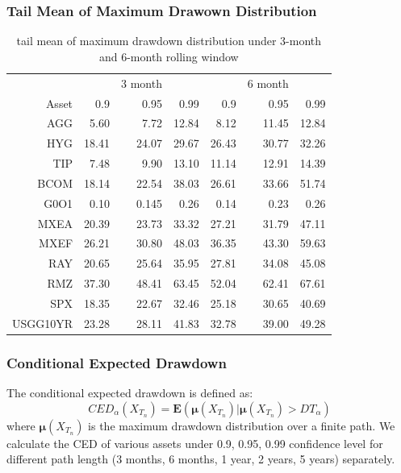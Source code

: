 \documentclass{beamer}
\newcommand\Fontviii{\fontsize{8}{9.2}\selectfont}
\begin{document}
\begin{frame}
\frametitle{Tail Mean of Maximum Drawown Distribution}
\Fontviii
\begin{table}[!h]
\centering 
\caption{tail mean of maximum drawdown distribution under 3-month and 6-month rolling window} %
\begin{tabular}{ | r || r r r || r r r |} 
 \hline
 & & 3 month & & & 6 month & \\
Asset& 0.9 & 0.95 & 0.99 & 0.9 & 0.95 & 0.99  \\
  \hline \hline
AGG &  5.60 &  7.72 & 12.84 &  8.12 & 11.45 & 12.84\\ 
HYG & 18.41 & 24.07 & 29.67 & 26.43 & 30.77 & 32.26\\ 
TIP &  7.48 &  9.90 & 13.10 & 11.14 & 12.91 & 14.39\\ 
BCOM & 18.14 & 22.54 & 38.03 & 26.61 & 33.66 & 51.74\\ 
G0O1 &  0.10 &  0.145 &  0.26 &  0.14 &  0.23 &  0.26\\ 
MXEA & 20.39 & 23.73 & 33.32 & 27.21 & 31.79 & 47.11\\ 
MXEF & 26.21 & 30.80 & 48.03 & 36.35 & 43.30 & 59.63\\ 
RAY & 20.65 & 25.64 & 35.95 & 27.81 & 34.08 & 45.08\\ 
RMZ & 37.30 & 48.41 & 63.45 & 52.04 & 62.41 & 67.61\\ 
SPX & 18.35 & 22.67 & 32.46 & 25.18 & 30.65 & 40.69\\ 
USGG10YR & 23.28 & 28.11 & 41.83 & 32.78 & 39.00 & 49.28\\
 \hline
\end{tabular}
\label{table:CED3}
\end{table}
\end{frame}


\begin{frame}
\frametitle{Conditional Expected Drawdown}
The conditional expected drawdown is defined as:
\begin{equation}
CED_\alpha(X_{T_n}) = \textbf{E}(\mathbf{\mu}(X_{T_n})|\mathbf{\mu}(X_{T_n}) > DT_\alpha)
\end{equation}
where $\mathbf{\mu}(X_{T_n})$ is the maximum drawdown distribution over a finite path.
We calculate the CED of various assets under 0.9, 0.95, 0.99 confidence level for different path length (3 months, 6 months, 1 year, 2 years, 5 years) separately. 
\end{frame}
\end{document}
